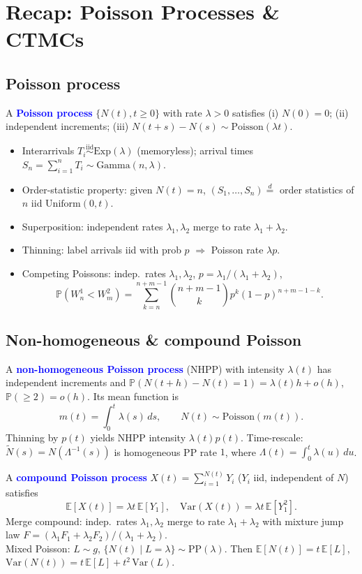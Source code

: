 \section{Recap: Poisson Processes \& CTMCs}
\subsection{Poisson process}
A \textcolor{Blue}{\textbf{Poisson process}} $\{N(t),t\ge 0\}$ with rate
$\lambda>0$ satisfies (i) $N(0)=0$; (ii) \textcolor{Bittersweet}{independent
increments}; (iii) $N(t+s)-N(s)\sim\mathrm{Poisson}(\lambda t)$.
\begin{itemize}
  \item \textcolor{Bittersweet}{Interarrivals} $T_i\stackrel{\mathrm{iid}}{\sim}\mathrm{Exp}(\lambda)$
    (\textcolor{Bittersweet}{memoryless}); arrival times
    $S_n=\sum_{i=1}^n T_i\sim\mathrm{Gamma}(n,\lambda)$.
  \item \textcolor{Bittersweet}{Order-statistic property}: given $N(t)=n$,
    $(S_1,\ldots,S_n)\stackrel{d}{=}$ order statistics of $n$ iid
    $\mathrm{Uniform}(0,t)$.
  \item \textcolor{Bittersweet}{Superposition}: independent rates
    $\lambda_1,\lambda_2$ merge to rate $\lambda_1+\lambda_2$.
  \item \textcolor{Bittersweet}{Thinning}: label arrivals iid with prob $p$
    $\Rightarrow$ Poisson rate $\lambda p$.
  \item \textcolor{Bittersweet}{Competing Poissons}: indep.\ rates $\lambda_1,\lambda_2$,
    $p=\lambda_1/(\lambda_1+\lambda_2)$,
    \[\mathbb{P}(W^1_n<W^2_m)=\sum_{k=n}^{n+m-1}\binom{n+m-1}{k}p^k(1-p)^{n+m-1-k}.\]
\end{itemize}

\subsection{Non-homogeneous \& compound Poisson}
A \textcolor{Blue}{\textbf{non-homogeneous Poisson process}} (NHPP) with
intensity $\lambda(t)$ has independent increments and
$\mathbb{P}(N(t+h)-N(t)=1)=\lambda(t)h+o(h)$, $\mathbb{P}(\ge 2)=o(h)$. Its
\textcolor{Bittersweet}{mean function} is
\[m(t)=\int_0^t \lambda(s)\,ds,\qquad N(t)\sim\mathrm{Poisson}(m(t)).\]
Thinning by $p(t)$ yields NHPP intensity $\lambda(t)p(t)$.
\textcolor{Bittersweet}{Time-rescale}: $\tilde N(s)=N(\Lambda^{-1}(s))$ is homogeneous PP
rate $1$, where $\Lambda(t)=\int_0^t\lambda(u)\,du$.

A \textcolor{Blue}{\textbf{compound Poisson process}}
$X(t)=\sum_{i=1}^{N(t)} Y_i$ ($Y_i$ iid, independent of $N$) satisfies
\[\mathbb{E}[X(t)]=\lambda t\,\mathbb{E}[Y_1],\quad
\mathrm{Var}(X(t))=\lambda t\,\mathbb{E}[Y_1^2].\]
\textcolor{Bittersweet}{Merge compound}: indep.\ rates $\lambda_1,\lambda_2$ merge to
rate $\lambda_1+\lambda_2$ with mixture jump law
$F=(\lambda_1 F_1+\lambda_2 F_2)/(\lambda_1+\lambda_2)$.\\
\textcolor{Bittersweet}{Mixed Poisson}: $L\sim g$, $\{N(t)\mid L=\lambda\}\sim\mathrm{PP}(\lambda)$.
Then $\mathbb{E}[N(t)]=t\,\mathbb{E}[L]$,
$\mathrm{Var}(N(t))=t\,\mathbb{E}[L]+t^2\,\mathrm{Var}(L)$.

